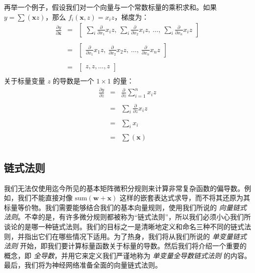 \documentclass[11pt]{article}
\begin{document}
再举一个例子，假设我们对一个向量与一个常数标量的乘积求和。如果 $y = \sum(\mathbf{x} z)$，那么 $f_i(\mathbf{x},z) = x_i z$，梯度为：
\[\begin{array}{lcl}
 \frac{\partial y}{\partial \mathbf{x}} & = & \begin{bmatrix} \sum_i \frac{\partial}{\partial x_1} x_i z,~ \sum_i \frac{\partial }{\partial x_2} x_i z,~ \ldots,~ \sum_i \frac{\partial}{\partial x_n} x_i z  \end{bmatrix}\\\\
 & = & \begin{bmatrix} \frac{\partial}{\partial x_1} x_1 z,~ \frac{\partial }{\partial x_2} x_2 z,~ \ldots,~ \frac{\partial}{\partial x_n} x_n z  \end{bmatrix}\\\\
 & = & \begin{bmatrix} z, z, \ldots, z \end{bmatrix}\\
\end{array}\]
关于标量变量 $z$ 的导数是一个 $1 \times 1$ 的量：
\[\begin{array}{lcl}
 \frac{\partial y}{\partial z} & = & \frac{\partial}{\partial z} \sum_{i=1}^n x_i z\\\\
 & = & \sum_i \frac{\partial}{\partial z} x_i z\\\\
 & = & \sum_i x_i\\\\
 & = & \sum(\mathbf{x})\\
\end{array}\]

\subsection{链式法则}\label{sec4.5}

我们无法仅使用迄今所见的基本矩阵微积分规则来计算非常复杂函数的偏导数。例如，我们不能直接对像 $\text{sum}(\mathbf{w} + \mathbf{x})$ 这样的嵌套表达式求导，而不将其还原为其标量等价物。我们需要能够结合我们的基本向量规则，使用我们所说的 {\em 向量链式法则}。不幸的是，有许多微分规则都被称为“链式法则”，所以我们必须小心我们所谈论的是哪一种链式法则。我们的目标之一是清晰地定义和命名三种不同的链式法则，并指出它们在哪些情况下适用。为了热身，我们将从我们所说的 {\em 单变量链式法则} 开始，即我们要计算标量函数关于标量的导数。然后我们将介绍一个重要的概念，即 {\em 全导数}，并用它来定义我们严谨地称为 {\em 单变量全导数链式法则} 的内容。最后，我们将为神经网络准备全面的向量链式法则。
\end{document}
